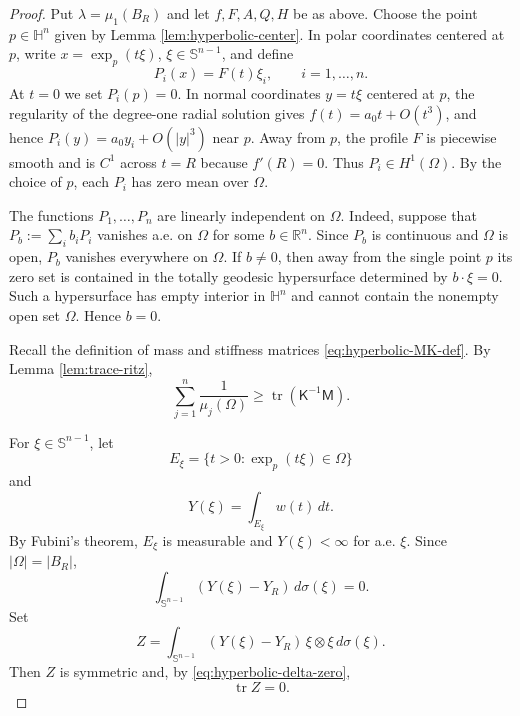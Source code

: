 \documentclass[10pt,a4paper]{amsart}
\DeclareMathOperator{\tr}{tr}
\newcommand{\HH}{\mathbb H}
\newcommand{\RR}{\mathbb R}
\newcommand{\Sn}{\mathbb S}
\newcommand{\mcM}{\mathsf M}
\newcommand{\mcK}{\mathsf K}
\begin{document}
\begin{proof}
Put $\lambda=\mu_1(B_R)$ and let $f,F,A,Q,H$ be as above.  Choose the point $p\in\HH^n$ given by Lemma \ref{lem:hyperbolic-center}.  In polar coordinates centered at $p$, write $x=\exp_p(t\xi)$, $\xi\in\Sn^{n-1}$, and define
\begin{equation}\label{eq:hyperbolic-P-def}
        P_i(x)=F(t)\xi_i,
        \qquad i=1,\dots,n.
\end{equation}
At $t=0$ we set $P_i(p)=0$.  In normal coordinates $y=t\xi$ centered at $p$, the regularity of the degree-one radial solution gives $f(t)=a_0t+O(t^3)$, and hence $P_i(y)=a_0y_i+O(|y|^3)$ near $p$.  Away from $p$, the profile $F$ is piecewise smooth and is $C^1$ across $t=R$ because $f'(R)=0$.  Thus $P_i\in H^1(\Omega)$.  By the choice of $p$, each $P_i$ has zero mean over $\Omega$.

The functions $P_1,\dots,P_n$ are linearly independent on $\Omega$.  Indeed, suppose that $P_b:=\sum_i b_iP_i$ vanishes a.e. on $\Omega$ for some $b\in\RR^n$.  Since $P_b$ is continuous and $\Omega$ is open, $P_b$ vanishes everywhere on $\Omega$.  If $b\ne0$, then away from the single point $p$ its zero set is contained in the totally geodesic hypersurface determined by $b\cdot\xi=0$.  Such a hypersurface has empty interior in $\HH^n$ and cannot contain the nonempty open set $\Omega$.  Hence $b=0$.

Recall the definition of mass and stiffness matrices \eqref{eq:hyperbolic-MK-def}. By Lemma \ref{lem:trace-ritz},
\begin{equation}\label{eq:hyperbolic-ritz-main}
        \sum_{j=1}^n\frac1{\mu_j(\Omega)}
        \ge \tr(\mcK^{-1}\mcM).
\end{equation}

For $\xi\in\Sn^{n-1}$, let
$$
        E_\xi=\{t>0:\exp_p(t\xi)\in\Omega\}
$$
and
$$
        Y(\xi)=\int_{E_\xi}w(t)\,dt.
$$
By Fubini's theorem, $E_\xi$ is measurable and $Y(\xi)<\infty$ for a.e. $\xi$.  Since $|\Omega|=|B_R|$,
\begin{equation}\label{eq:hyperbolic-delta-zero}
        \int_{\Sn^{n-1}}(Y(\xi)-Y_R)\,d\sigma(\xi)=0.
\end{equation}
Set
\begin{equation}\label{eq:hyperbolic-Z-def}
        Z=\int_{\Sn^{n-1}}(Y(\xi)-Y_R)\,\xi\otimes\xi\,d\sigma(\xi).
\end{equation}
Then $Z$ is symmetric and, by \eqref{eq:hyperbolic-delta-zero},
\begin{equation}\label{eq:hyperbolic-Z-trace-zero}
        \tr Z=0.
\end{equation}


\end{proof}
\end{document}
